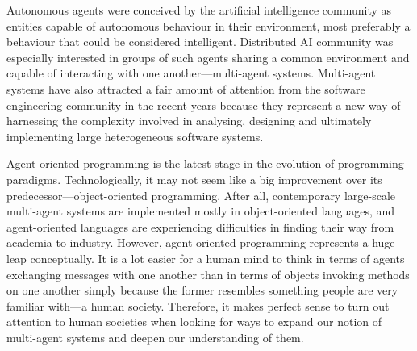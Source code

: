 


Autonomous agents were conceived by the artificial intelligence community as entities capable of autonomous behaviour in their environment, most preferably a behaviour that could be considered intelligent.
Distributed AI community was especially interested in groups of such agents sharing a common environment and capable of interacting with one another---multi-agent systems.
Multi-agent systems have also attracted a fair amount of attention from the software engineering community in the recent years because they represent a new way of harnessing the complexity involved in analysing, designing and ultimately implementing large heterogeneous software systems.
 
Agent-oriented programming is the latest stage in the evolution of programming paradigms.
Technologically, it may not seem like a big improvement over its predecessor---object-oriented programming.
After all, contemporary large-scale multi-agent systems are implemented mostly in object-oriented languages, and agent-oriented languages are experiencing difficulties in finding their way from academia to industry.
However, agent-oriented programming represents a huge leap conceptually.
It is a lot easier for a human mind to think in terms of agents exchanging messages with one another than in terms of objects invoking methods on one another simply because the former resembles something people are very familiar with---a human society.
Therefore, it makes perfect sense to turn out attention to human societies when looking for ways to expand our notion of multi-agent systems and deepen our understanding of them.

